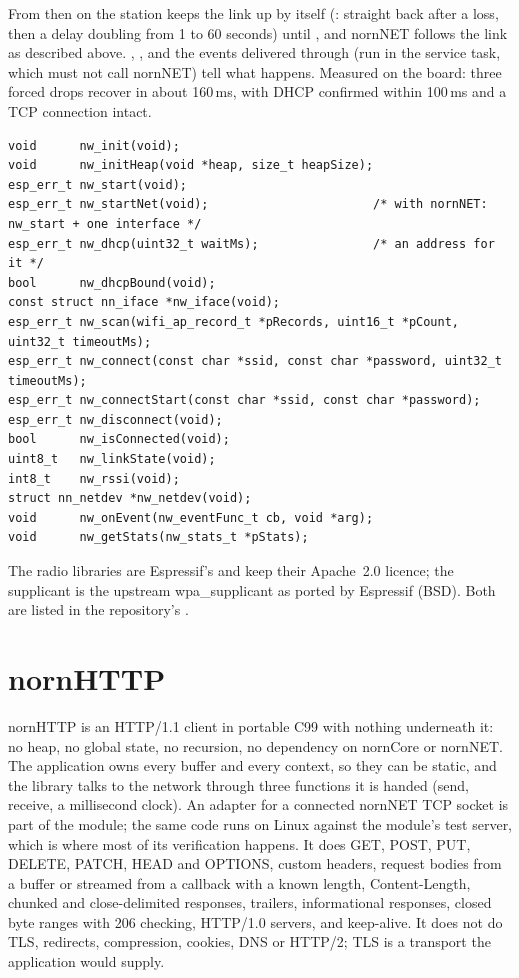 From then on the station keeps the link up by itself (: straight
back after a loss, then a delay doubling from 1 to 60 seconds) until
, and nornNET follows the link as described above.
, ,  and the events delivered
through  (run in the service task, which must not call nornNET) tell
what happens. Measured on the board: three forced drops recover in about 160\,ms, with
DHCP confirmed within 100\,ms and a TCP connection intact.

\begin{lstlisting}
void      nw_init(void);
void      nw_initHeap(void *heap, size_t heapSize);
esp_err_t nw_start(void);
esp_err_t nw_startNet(void);                       /* with nornNET: nw_start + one interface */
esp_err_t nw_dhcp(uint32_t waitMs);                /* an address for it */
bool      nw_dhcpBound(void);
const struct nn_iface *nw_iface(void);
esp_err_t nw_scan(wifi_ap_record_t *pRecords, uint16_t *pCount, uint32_t timeoutMs);
esp_err_t nw_connect(const char *ssid, const char *password, uint32_t timeoutMs);
esp_err_t nw_connectStart(const char *ssid, const char *password);
esp_err_t nw_disconnect(void);
bool      nw_isConnected(void);
uint8_t   nw_linkState(void);
int8_t    nw_rssi(void);
struct nn_netdev *nw_netdev(void);
void      nw_onEvent(nw_eventFunc_t cb, void *arg);
void      nw_getStats(nw_stats_t *pStats);
\end{lstlisting}

The radio libraries are Espressif's and keep their Apache~2.0 licence; the supplicant is
the upstream wpa\_supplicant as ported by Espressif (BSD). Both are listed in the
repository's .

\section{nornHTTP}
\label{sec:nornhttp}

nornHTTP is an HTTP/1.1 client in portable C99 with nothing underneath it: no heap, no
global state, no recursion, no dependency on nornCore or nornNET. The application owns
every buffer and every context, so they can be static, and the library talks to the
network through three functions it is handed (send, receive, a millisecond clock). An
adapter for a connected nornNET TCP socket is part of the module; the same code runs
on Linux against the module's test server, which is where most of its verification
happens. It does GET, POST, PUT, DELETE, PATCH, HEAD and OPTIONS, custom headers,
request bodies from a buffer or streamed from a callback with a known length,
Content-Length, chunked and close-delimited responses, trailers, informational
responses, closed byte ranges with 206 checking, HTTP/1.0 servers, and keep-alive. It
does not do TLS, redirects, compression, cookies, DNS or HTTP/2; TLS is a transport the
application would supply.

